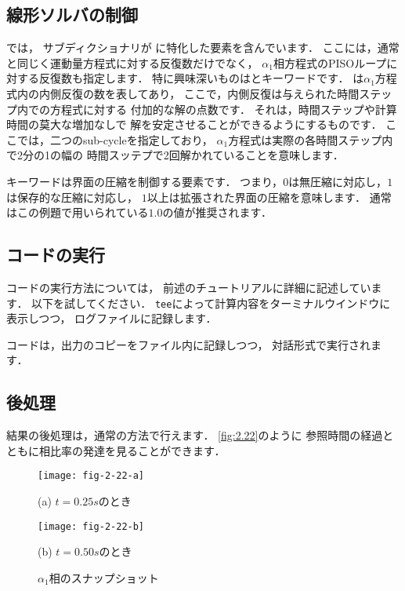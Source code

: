 \subsection{線形ソルバの制御}
\label{ssec:2.3.7}
では，
サブディクショナリが
に特化した要素を含んでいます．
ここには，通常と同じく運動量方程式に対する反復数だけでなく，
$\alpha_{1}$相方程式のPISOループに対する反復数も指定します．
特に興味深いものはとキーワードです．
%
%
は$\alpha_{1}$方程式内の内側反復の数を表してあり，
ここで，内側反復は与えられた時間ステップ内での方程式に対する
付加的な解の点数です．
それは，時間ステップや計算時間の莫大な増加なしで
解を安定させることができるようにするものです．
ここでは，二つのsub-cycleを指定しており，
$\alpha_{1}$方程式は実際の各時間ステップ内で2分の1の幅の
時間スッテプで2回解かれていることを意味します．

%
%
キーワードは界面の圧縮を制御する要素です．
つまり，$0$は無圧縮に対応し，$1$は保存的な圧縮に対応し，
$1$以上は拡張された界面の圧縮を意味します．
通常はこの例題で用いられている$1.0$の値が推奨されます．


\subsection{コードの実行}
\label{ssec:2.3.8}
コードの実行方法については，
前述のチュートリアルに詳細に記述しています．
以下を試してください．
\texttt{tee}によって計算内容をターミナルウインドウに表示しつつ，
ログファイルに記録します．
コードは，出力のコピーをファイル内に記録しつつ，
対話形式で実行されます．


\subsection{後処理}
\label{ssec:2.3.9}
結果の後処理は，通常の方法で行えます．
\autoref{fig:2.22}のように
参照時間の経過とともに相比率の発達を見ることができます．


\begin{figure}[ht]
 \texttt{[image: fig-2-22-a]}\par
 (a) $t = 0.25\unit{s}$のとき\par
 \medskip
 \texttt{[image: fig-2-22-b]}\par
 (b) $t = 0.50\unit{s}$のとき
 \caption{$\alpha_{1}$相のスナップショット}
 \label{fig:2.22}
\end{figure}


